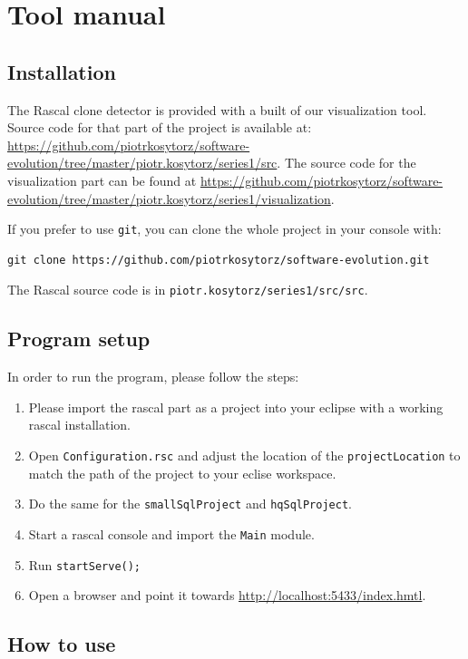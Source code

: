 \documentclass{uva-inf-article}
\begin{document}
\section{Tool manual}

\subsection{Installation}

The Rascal clone detector is provided with a built of our visualization tool. Source code for that part of the project is available at: \url{https://github.com/piotrkosytorz/software-evolution/tree/master/piotr.kosytorz/series1/src}. The source code for the visualization part can be found at \url{https://github.com/piotrkosytorz/software-evolution/tree/master/piotr.kosytorz/series1/visualization}.

If you prefer to use \texttt{git}, you can clone the whole project in your console with:

\begin{verbatim}
git clone https://github.com/piotrkosytorz/software-evolution.git
\end{verbatim}

The Rascal source code is in \texttt{piotr.kosytorz/series1/src/src}.

\subsection{Program setup}

In order to run the program, please follow the steps:

\begin{enumerate}
\item Please import the rascal part as a project into your eclipse with a working rascal installation.
\item
  Open \texttt{Configuration.rsc} and adjust the location of the \texttt{projectLocation} to match the path of the project to your eclise workspace.
\item Do the same for the \texttt{smallSqlProject} and \texttt{hqSqlProject}.
\item Start a rascal console and import the \texttt{Main} module.
\item Run \texttt{startServe();}
\item Open a browser and point it towards \url{http://localhost:5433/index.hmtl}.
\end{enumerate}

\subsection{How to use}
\end{document}
